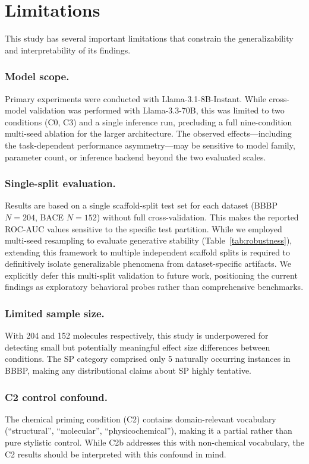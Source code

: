 \section{Limitations}
\label{sec:limitations}

This study has several important limitations that constrain the generalizability and interpretability of its findings.

\subsubsection*{Model scope.} Primary experiments were conducted with Llama-3.1-8B-Instant. While cross-model validation was performed with Llama-3.3-70B, this was limited to two conditions (C0, C3) and a single inference run, precluding a full nine-condition multi-seed ablation for the larger architecture. The observed effects—including the task-dependent performance asymmetry—may be sensitive to model family, parameter count, or inference backend beyond the two evaluated scales.

\subsubsection*{Single-split evaluation.} Results are based on a single scaffold-split test set for each dataset (BBBP $N=204$, BACE $N=152$) without full cross-validation. This makes the reported ROC-AUC values sensitive to the specific test partition. While we employed multi-seed resampling to evaluate generative stability (Table~\ref{tab:robustness}), extending this framework to multiple independent scaffold splits is required to definitively isolate generalizable phenomena from dataset-specific artifacts. We explicitly defer this multi-split validation to future work, positioning the current findings as exploratory behavioral probes rather than comprehensive benchmarks.

\subsubsection*{Limited sample size.} With 204 and 152 molecules respectively, this study is underpowered for detecting small but potentially meaningful effect size differences between conditions. The SP category comprised only 5 naturally occurring instances in BBBP, making any distributional claims about SP highly tentative.

\subsubsection*{C2 control confound.} The chemical priming condition (C2) contains domain-relevant vocabulary (``structural'', ``molecular'', ``physicochemical''), making it a partial rather than pure stylistic control. While C2b addresses this with non-chemical vocabulary, the C2 results should be interpreted with this confound in mind.

